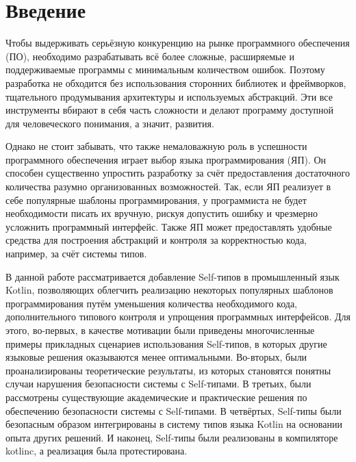 \section*{Введение}

Чтобы выдерживать серьёзную конкуренцию на рынке программного обеспечения (ПО), необходимо разрабатывать всё более сложные, расширяемые и поддерживаемые программы с минимальным количеством ошибок.
Поэтому разработка не обходится без использования сторонних библиотек и фреймворков, тщательного продумывания архитектуры и используемых абстракций.
Эти все инструменты вбирают в себя часть сложности и делают программу доступной для человеческого понимания, а значит, развития.

Однако не стоит забывать, что также немаловажную роль в успешности программного обеспечения играет выбор языка программирования (ЯП).
Он способен существенно упростить разработку за счёт предоставления достаточного количества разумно организованных возможностей.
Так, если ЯП реализует в себе популярные шаблоны программирования, у программиста не будет необходимости писать их вручную, рискуя допустить ошибку и чрезмерно усложнить программный интерфейс.
Также ЯП может предоставлять удобные средства для построения абстракций и контроля за корректностью кода, например, за счёт системы типов.

В данной работе рассматривается добавление Self-типов в промышленный язык Kotlin, позволяющих облегчить реализацию некоторых популярных шаблонов программирования путём уменьшения количества необходимого кода, дополнительного типового контроля и упрощения программных интерфейсов.
Для этого, во-первых, в качестве мотивации были приведены многочисленные примеры прикладных сценариев использования Self-типов, в которых другие языковые решения оказываются менее оптимальными.
Во-вторых, были проанализированы теоретические результаты, из которых становятся понятны случаи нарушения безопасности системы с Self-типами.
В третьих, были рассмотрены существующие академические и практические решения по обеспечению безопасности системы с Self-типами.
В четвёртых, Self-типы были безопасным образом интегрированы в систему типов языка Kotlin на основании опыта других решений.
И наконец, Self-типы были реализованы в компиляторе kotlinc, а реализация была протестирована.
